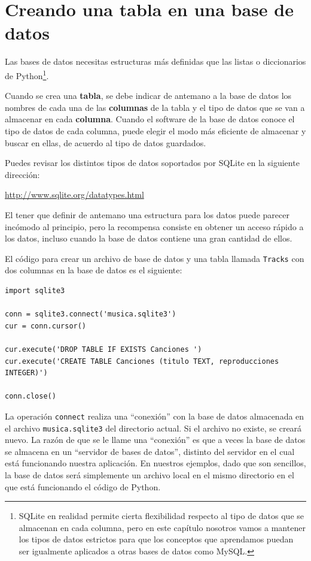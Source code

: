 \section{Creando una tabla en una base de datos}

Las bases de datos necesitas estructuras más definidas que las listas
o diccionarios de Python\footnote{SQLite en realidad permite cierta
flexibilidad respecto al tipo de datos que se almacenan en cada columna,
pero en este capítulo nosotros vamos a mantener los tipos de datos estrictos
para que los conceptos que aprendamos puedan ser igualmente aplicados a otras
bases de datos como MySQL.}.

Cuando se crea una {\bf tabla}, se debe
indicar de antemano a la base de datos los nombres de cada una de las
{\bf columnas} de la tabla y el tipo de datos que se van a
almacenar en cada {\bf columna}. Cuando el software de la base de datos
conoce el tipo de datos de cada columna, puede elegir el modo más
eficiente de almacenar y buscar en ellas, de acuerdo al tipo de
datos guardados.

Puedes revisar los distintos tipos de datos soportados por SQLite
en la siguiente dirección:

\url{http://www.sqlite.org/datatypes.html}

El tener que definir de antemano una estructura para los datos puede parecer incómodo
al principio, pero la recompensa consiste en obtener un acceso rápido a los datos,
incluso cuando la base de datos contiene una gran cantidad de ellos.

El código para crear un archivo de base de datos y una tabla
llamada {\tt Tracks} con dos columnas en la
base de datos es el siguiente:

\beforeverb
\begin{verbatim}
import sqlite3

conn = sqlite3.connect('musica.sqlite3')
cur = conn.cursor()

cur.execute('DROP TABLE IF EXISTS Canciones ')
cur.execute('CREATE TABLE Canciones (titulo TEXT, reproducciones INTEGER)')

conn.close()
\end{verbatim}
\afterverb
%
La operación {\tt connect} realiza una ``conexión'' con la base de datos
almacenada en el archivo {\tt musica.sqlite3} del directorio actual. Si
el archivo no existe, se creará nuevo. La razón de que se le
llame una ``conexión'' es que a veces la base de datos se almacena en
un ``servidor de bases de datos'', distinto del servidor en el cual está
funcionando nuestra aplicación. En nuestros ejemplos, dado que son sencillos,
la base de datos será simplemente un archivo local en el mismo directorio
en el que está funcionando el código de Python.

